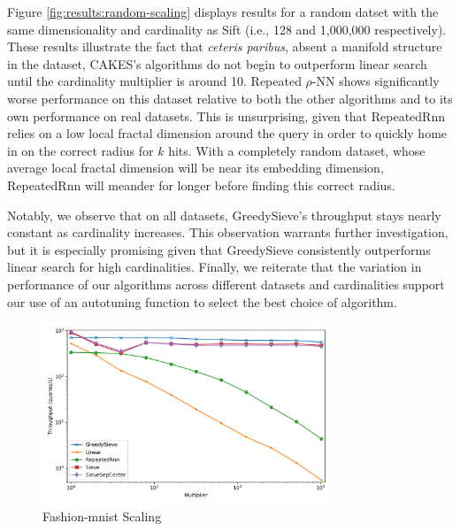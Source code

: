 Figure \ref{fig:results:random-scaling} displays results for a random datset with the same dimensionality and cardinality as Sift (i.e., 128 and 1,000,000 respectively). 
These results illustrate the fact that \emph{ceteris paribus}, absent a manifold structure in the dataset, CAKES's algorithms do not begin to outperform linear search until the cardinality multiplier is around 10. 
Repeated $\rho$-NN shows significantly worse performance on this dataset relative to both the other algorithms and to its own performance on real datasets. 
This is unsurprising, given that RepeatedRnn relies on a low local fractal dimension around the query in order to quickly home in on the correct radius for $k$ hits. 
With a completely random dataset, whose average local fractal dimension will be near its embedding dimension, RepeatedRnn will meander for longer before finding this correct radius. 

Notably, we observe that on all datasets, GreedySieve's throughput stays nearly constant as cardinality increases. This observation warrants further investigation, but it is especially promising given that GreedySieve consistently outperforms linear search for high cardinalities. 
Finally, we reiterate that the variation in performance of our algorithms across different datasets and cardinalities support our use of an autotuning function to select the best choice of algorithm. 


\begin{figure}[ht!]
    \centering
    \includegraphics[width=3.4in]{images/result_plots/fashion-mnist_10_scaling.png}
    \caption{
        Fashion-mnist Scaling
    }
    \label{fig:results:fashion-mnist-scaling}
\end{figure}

